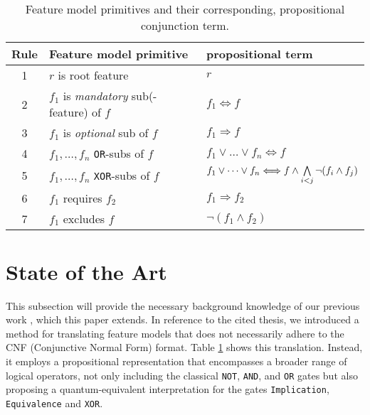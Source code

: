 \begin{table}
    \centering
    \begin{tabular}{c|l|p{2.5cm}}
         Rule & Feature model primitive & propositional term\\
         \hline
         \hline
         1&$r$ is root feature & $r$\\
         \hline
         2&$f_1$ is \textit{mandatory} sub(-feature) of $f$ & $f_1 \Longleftrightarrow f$\\
         \hline
         3&$f_1$ is \textit{optional} sub of $f$ & $f_1 \Longrightarrow f$\\
         \hline
         4&$f_1,\dots,f_n$ \texttt{OR}-subs of $f$ & $f_1 \lor \dots \lor f_n \Longleftrightarrow f$\\
         \hline
         5&$f_1,\dots,f_n$ \texttt{XOR}-subs of $f$ & $f_1 \lor \dots \lor f_n \Longleftrightarrow f \newline \land \bigwedge\limits_{i<j}\lnot(f_i\land f_j)$\\
         \hline
         6&$f_1$ requires $f_2$ & $f_1 \Longrightarrow f_2$\\
         \hline
         7&$f_1$ excludes $f$ & $\lnot (f_1 \land f_2)$\\
    \end{tabular}
    \caption{Feature model primitives and their corresponding, propositional conjunction term.}
    \label{tab:bg:thesis:feature-table}
\end{table}
\section{State of the Art}
This subsection will provide the necessary background knowledge of our previous work \cite{thesis-marwin-kadner}, which this paper extends.
In reference to the cited thesis, we introduced a method for translating feature models that does not necessarily adhere to the CNF (Conjunctive Normal Form) format. Table \ref{tab:bg:thesis:feature-table} shows this translation.
Instead, it employs a propositional representation that encompasses a broader range of logical operators, not only including the classical \texttt{NOT}, \texttt{AND}, and \texttt{OR} gates but also proposing a quantum-equivalent interpretation for the gates \texttt{Implication}, \texttt{Equivalence} and \texttt{XOR}.

